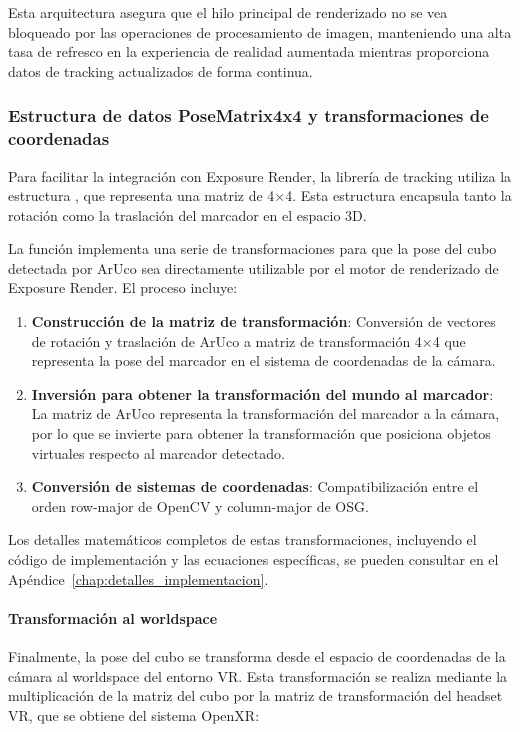 Esta arquitectura asegura que el hilo principal de renderizado no se vea bloqueado por las operaciones de procesamiento de imagen, manteniendo una alta tasa de refresco en la experiencia de realidad aumentada mientras proporciona datos de tracking actualizados de forma continua.

\subsubsection{Estructura de datos PoseMatrix4x4 y transformaciones de coordenadas}

Para facilitar la integración con Exposure Render, la librería de tracking utiliza la estructura , que representa una matriz de 4×4. Esta estructura encapsula tanto la rotación como la traslación del marcador en el espacio 3D.

La función  implementa una serie de transformaciones para que la pose del cubo detectada por ArUco sea directamente utilizable por el motor de renderizado de Exposure Render. El proceso incluye:

\begin{enumerate}
    \item \textbf{Construcción de la matriz de transformación}: Conversión de vectores de rotación y traslación de ArUco a matriz de transformación 4×4 que representa la pose del marcador en el sistema de coordenadas de la cámara.
    \item \textbf{Inversión para obtener la transformación del mundo al marcador}: La matriz de ArUco representa la transformación del marcador a la cámara, por lo que se invierte para obtener la transformación que posiciona objetos virtuales respecto al marcador detectado.
    \item \textbf{Conversión de sistemas de coordenadas}: Compatibilización entre el orden row-major de OpenCV y column-major de OSG.
\end{enumerate}

Los detalles matemáticos completos de estas transformaciones, incluyendo el código de implementación y las ecuaciones específicas, se pueden consultar en el Apéndice~\ref{chap:detalles_implementacion}.




\paragraph{Transformación al \gls{worldspace}}
Finalmente, la pose del cubo se transforma desde el espacio de coordenadas de la cámara al \gls{worldspace} del entorno VR. Esta transformación se realiza mediante la multiplicación de la matriz del cubo por la matriz de transformación del headset VR, que se obtiene del sistema OpenXR:

